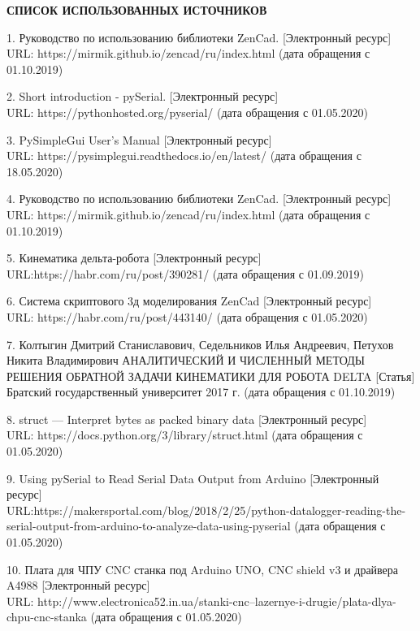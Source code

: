 \begin{center}
\large{\textbf{СПИСОК ИСПОЛЬЗОВАННЫХ ИСТОЧНИКОВ}}\\
\end{center}

1. Руководство по использованию библиотеки ZenCad. [Электронный ресурс] URL: https://mirmik.github.io/zencad/ru/index.html (дата обращения с 01.10.2019)


2. Short introduction - pySerial. [Электронный ресурс]\\ URL: https://pythonhosted.org/pyserial/ (дата обращения с 01.05.2020)


3. PySimpleGui User's Manual  [Электронный ресурс]\\ URL: https://pysimplegui.readthedocs.io/en/latest/ (дата обращения с 18.05.2020)


4. Руководство по использованию библиотеки ZenCad. [Электронный ресурс]\\ URL: https://mirmik.github.io/zencad/ru/index.html (дата обращения с 01.10.2019)


5. Кинематика дельта-робота [Электронный ресурс]\\ URL:https://habr.com/ru/post/390281/  (дата обращения с 01.09.2019)


6. Система скриптового 3д моделирования ZenCad [Электронный ресурс] \\ URL: https://habr.com/ru/post/443140/ (дата обращения с 01.05.2020)


7. Колтыгин Дмитрий Станиславович, Седельников Илья Андреевич, Петухов Никита Владимирович АНАЛИТИЧЕСКИЙ И ЧИСЛЕННЫЙ МЕТОДЫ РЕШЕНИЯ ОБРАТНОЙ ЗАДАЧИ КИНЕМАТИКИ ДЛЯ РОБОТА DELTA [Статья] Братский государственный университет 2017 г.   (дата обращения с 01.10.2019)


8. struct — Interpret bytes as packed binary data [Электронный ресурс] \\ URL: https://docs.python.org/3/library/struct.html (дата обращения с 01.05.2020)


9. Using pySerial to Read Serial Data Output from Arduino [Электронный ресурс] \\ URL:https://makersportal.com/blog/2018/2/25/python-datalogger-reading-the-serial-output-from-arduino-to-analyze-data-using-pyserial  (дата обращения с 01.05.2020)


10. Плата для ЧПУ CNC станка под Arduino UNO, CNC shield v3 и драйвера A4988 [Электронный ресурс] \\ URL: http://www.electronica52.in.ua/stanki-cnc--lazernye-i-drugie/plata-dlya-chpu-cnc-stanka (дата обращения с 01.05.2020)


